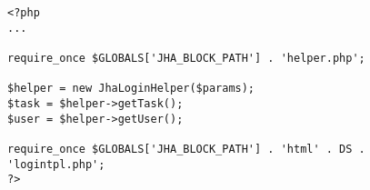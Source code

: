 \begin{lstlisting}[label=jha_block_login,caption=Punto de entrada al bloque.]
<?php
...

require_once $GLOBALS['JHA_BLOCK_PATH'] . 'helper.php';

$helper = new JhaLoginHelper($params);
$task = $helper->getTask();
$user = $helper->getUser();

require_once $GLOBALS['JHA_BLOCK_PATH'] . 'html' . DS . 'logintpl.php';
?>
\end{lstlisting}
